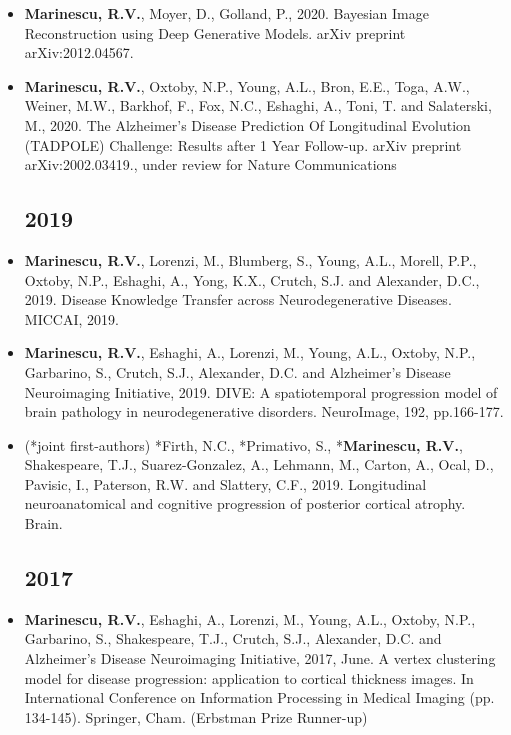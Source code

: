 \documentclass[a4paper,10pt]{article} %
\begin{document}
\newcommand{\poster}{\textcolor{red}{Poster}}
\newcommand{\talk}{\textcolor{darkgreen}{Oral}}
\newcommand{\journal}{\textcolor{blue}{Journal}}


\begin{itemize}
\subsection*{2020}
\item[Conference] \textbf{Marinescu, R.V.}, Moyer, D., Golland, P., 2020. Bayesian Image Reconstruction using Deep Generative Models. arXiv preprint arXiv:2012.04567.
\item[\journal] \textbf{Marinescu, R.V.}, Oxtoby, N.P., Young, A.L., Bron, E.E., Toga, A.W., Weiner, M.W., Barkhof, F., Fox, N.C., Eshaghi, A., Toni, T. and Salaterski, M., 2020. The Alzheimer's Disease Prediction Of Longitudinal Evolution (TADPOLE) Challenge: Results after 1 Year Follow-up. arXiv preprint arXiv:2002.03419., under review for Nature Communications

\subsection*{2019}
\item[\poster] \textbf{Marinescu, R.V.}, Lorenzi, M., Blumberg, S., Young, A.L., Morell, P.P., Oxtoby, N.P., Eshaghi, A., Yong, K.X., Crutch, S.J. and Alexander, D.C., 2019. Disease Knowledge Transfer across Neurodegenerative Diseases. MICCAI, 2019.

\item[\journal] \textbf{Marinescu, R.V.}, Eshaghi, A., Lorenzi, M., Young, A.L., Oxtoby, N.P., Garbarino, S., Crutch, S.J., Alexander, D.C. and Alzheimer's Disease Neuroimaging Initiative, 2019. DIVE: A spatiotemporal progression model of brain pathology in neurodegenerative disorders. NeuroImage, 192, pp.166-177.

\item[\journal] (*joint first-authors) *Firth, N.C., *Primativo, S., *\textbf{Marinescu, R.V.}, Shakespeare, T.J., Suarez-Gonzalez, A., Lehmann, M., Carton, A., Ocal, D., Pavisic, I., Paterson, R.W. and Slattery, C.F., 2019. Longitudinal neuroanatomical and cognitive progression of posterior cortical atrophy. Brain.

\subsection*{2017}
\item[\talk] \textbf{Marinescu, R.V.}, Eshaghi, A., Lorenzi, M., Young, A.L., Oxtoby, N.P., Garbarino, S., Shakespeare, T.J., Crutch, S.J., Alexander, D.C. and Alzheimer’s Disease Neuroimaging Initiative, 2017, June. A vertex clustering model for disease progression: application to cortical thickness images. In International Conference on Information Processing in Medical Imaging (pp. 134-145). Springer, Cham. (Erbstman Prize Runner-up)



\end{itemize}
\end{document}

